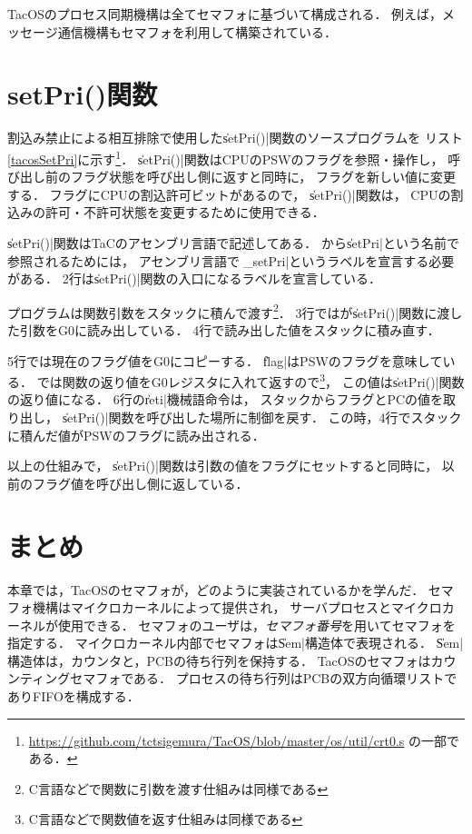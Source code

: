 TacOSのプロセス同期機構は全てセマフォに基づいて構成される．
例えば，メッセージ通信機構もセマフォを利用して構築されている．

\section{setPri()関数}
\label{setPri}
割込み禁止による相互排除で使用した\|setPri()|関数のソースプログラムを
リスト\ref{tacosSetPri}に示す\footnote{
  \url{https://github.com/tctsigemura/TacOS/blob/master/os/util/crt0.s}
  の一部である．}．
\|setPri()|関数はCPUのPSWのフラグを参照・操作し，
呼び出し前のフラグ状態を呼び出し側に返すと同時に，
フラグを新しい値に変更する．
フラグにCPUの割込許可ビットがあるので，
\|setPri()|関数は，
CPUの割込みの許可・不許可状態を変更するために使用できる．



\|setPri()|関数はTaCのアセンブリ言語で記述してある．
{\cmml}から\|setPri|という名前で参照されるためには，
アセンブリ言語では\|_setPri|というラベルを宣言する必要がある．
2行は\|setPri()|関数の入口になるラベルを宣言している．

{\cmml}プログラムは関数引数をスタックに積んで渡す\footnote{
  C言語などで関数に引数を渡す仕組みは同様である}．
3行では{\cmml}が\|setPri()|関数に渡した引数をG0に読み出している．
4行で読み出した値をスタックに積み直す．

5行では現在のフラグ値をG0にコピーする．
\|flag|はPSWのフラグを意味している．
{\cmml}では関数の返り値をG0レジスタに入れて返すので\footnote{
  C言語などで関数値を返す仕組みは同様である}，
この値は\|setPri()|関数の返り値になる．
6行の\|reti|機械語命令は，
スタックからフラグとPCの値を取り出し，
\|setPri()|関数を呼び出した場所に制御を戻す．
この時，4行でスタックに積んだ値がPSWのフラグに読み出される．

以上の仕組みで，
\|setPri()|関数は引数の値をフラグにセットすると同時に，
以前のフラグ値を呼び出し側に返している．

\section{まとめ}
本章では，TacOSのセマフォが，どのように実装されているかを学んだ．
セマフォ機構はマイクロカーネルによって提供され，
サーバプロセスとマイクロカーネルが使用できる．
セマフォのユーザは，\emph{セマフォ番号}を用いてセマフォを指定する．
マイクロカーネル内部でセマフォは\|Sem|構造体で表現される．
\|Sem|構造体は，カウンタと，PCBの待ち行列を保持する．
TacOSのセマフォはカウンティングセマフォである．
プロセスの待ち行列はPCBの双方向循環リストでありFIFOを構成する．


